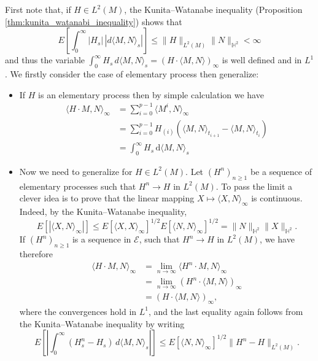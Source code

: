 \documentclass[../Main.tex]{subfiles}
\begin{document}
{\begin{enumerate}
    First note that, if $H \in L^2(M)$, the Kunita--Watanabe inequality (Proposition \ref{thm:kunita_watanabi_inequality}) shows that
    $$
    E\left[ \int_0^\infty |H_s| \, |d\langle M, N \rangle_s| \right] \le \|H\|_{L^2(M)} \|N\|_{\mathbb{H}^2} < \infty
    $$
    and thus the variable $\int_0^\infty H_s \, d\langle M, N \rangle_s = (H \cdot \langle M, N \rangle)_\infty$ is well defined and in $L^1$.
    We firstly consider the case of elementary process then generalize:
    \begin{itemize}
        \item If $H$ is an elementary process then by simple calculation we have
        \begin{align*} 
            \langle H \cdot M, N \rangle_\infty 
                &= \sum_{i=0}^{p-1} \langle M^i, N \rangle_\infty \\ 
                &= \sum_{i=0}^{p-1} H_{(i)} \left( \langle M, N \rangle_{t_{i+1} } - \langle M, N \rangle_{t_i } \right) \\ 
                &= \int_0^\infty H_s \, \mathrm{d}\langle M, N \rangle_s 
        \end{align*}
        \item Now we need to generalize for $H \in L^2(M)$. Let $(H^n)_{n \ge 1}$ be a sequence of elementary processes such that $H^n \to H$ in $L^2(M)$. To pass the limit a clever idea is to prove that the linear mapping $X \mapsto \langle X, N \rangle_\infty$ is continuous. Indeed, by the Kunita--Watanabe inequality,
        $$
        E\left[ |\langle X, N \rangle_\infty| \right] \le E\left[ \langle X, X \rangle_\infty \right]^{1/2} E\left[ \langle N, N \rangle_\infty \right]^{1/2} = \|N\|_{\mathbb{H}^2} \|X\|_{\mathbb{H}^2}.
        $$
        If $(H^n)_{n \ge 1}$ is a sequence in $\mathcal{E}$, such that $H^n \to H$ in $L^2(M)$, we have therefore
        \begin{align*}
        \langle H \cdot M, N \rangle_\infty &= \lim_{n \to \infty} \langle H^n \cdot M, N \rangle_\infty \\
        &= \lim_{n \to \infty} (H^n \cdot \langle M, N \rangle)_\infty \\
        &= (H \cdot \langle M, N \rangle)_\infty,
        \end{align*}
        where the convergences hold in $L^1$, and the last equality again follows from the Kunita--Watanabe inequality by writing
        $$
        E\left[ \left| \int_0^\infty (H_s^n - H_s) \, d\langle M, N \rangle_s \right| \right] \le E\left[ \langle N, N \rangle_\infty \right]^{1/2} \|H^n - H\|_{L^2(M)}.
$$
\end{itemize}
\end{enumerate}}
\end{document}
